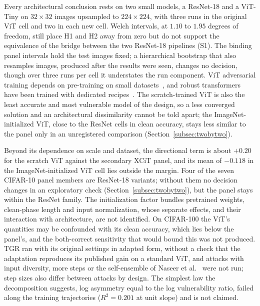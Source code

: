 Every architectural conclusion rests on two small models, a ResNet-18 and a ViT-Tiny on $32\times32$ images upsampled to $224\times224$, with three runs in the original ViT cell and two in each new cell. Welch intervals, at $1.10$ to $1.95$ degrees of freedom, still place H1 and H2 away from zero but do not support the equivalence of the bridge between the two ResNet-18 pipelines (S1). The binding panel intervals hold the test images fixed; a hierarchical bootstrap that also resamples images, produced after the results were seen, changes no decision, though over three runs per cell it understates the run component. ViT adversarial training depends on pre-training on small datasets~\cite{mo2022adversarial}, and robust transformers have been trained with dedicated recipes~\cite{debenedetti2023light}. The scratch-trained ViT is also the least accurate and most vulnerable model of the design, so a less converged solution and an architectural dissimilarity cannot be told apart; the ImageNet-initialized ViT, close to the ResNet cells in clean accuracy, stays less similar to the panel only in an unregistered comparison (Section~\ref{subsec:twobytwo}).

Beyond its dependence on scale and dataset, the directional term is about $+0.20$ for the scratch ViT against the secondary XCiT panel, and its mean of $-0.118$ in the ImageNet-initialized ViT cell lies outside the margin. Four of the seven CIFAR-10 panel members are ResNet-18 variants; without them no decision changes in an exploratory check (Section~\ref{subsec:twobytwo}), but the panel stays within the ResNet family. The initialization factor bundles pretrained weights, clean-phase length and input normalization, whose separate effects, and their interaction with architecture, are not identified. On CIFAR-100 the ViT's quantities may be confounded with its clean accuracy, which lies below the panel's, and the both-correct sensitivity that would bound this was not produced. TGR ran with its original settings in adapted form, without a check that the adaptation reproduces its published gain on a standard ViT, and attacks with input diversity, more steps or the self-ensemble of Naseer et al.~\cite{naseer2022improving} were not run; step sizes also differ between attacks by design. The simplest law the decomposition suggests, log asymmetry equal to the log vulnerability ratio, failed along the training trajectories ($R^2 = 0.201$ at unit slope) and is not claimed.

